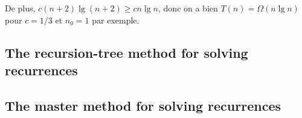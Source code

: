 \begin{description}
\begin{ex}
    De plus, $ c(n+2)\lg(n+2) \ge cn\lg n$, donc on a bien $T(n) = \Omega(n\lg n)$ pour $c = 1/3$ et $n_0 = 1$ par exemple.

  \end{ex}

   {\itshape }

    \begin{exrev} 

    \end{exrev}

   {\itshape }

    \begin{exrev}
      
    \end{exrev}

   {\itshape }

    \begin{exrev}
      
    \end{exrev}

   {\itshape }

    \begin{exrev}
      
    \end{exrev}

   {\itshape }

    \begin{exrev}
      
    \end{exrev}

   {\itshape }

    \begin{exrev}
      
    \end{exrev}

\end{description}

\subsection{The recursion-tree method for solving recurrences}

\subsection{The master method for solving recurrences}

